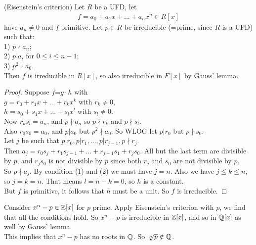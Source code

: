\documentclass[a4paper]{article}
\begin{document}
\begin{thm} (Eisenstein's criterion) 
Let $R$ be a UFD, let
\begin{equation*}
\begin{aligned}
f=a_0 + a_1 x + ... + a_n x^n \in R[x]
\end{aligned}
\end{equation*}
have $a_n \neq 0$ and $f$ primitive. Let $p\in R$ be irreducible (=prime, since $R$ is a UFD) such that:\\
1) $p \nmid a_n$;\\
2) $p | a_i$ for $0 \leq i \leq n-1$;\\
3) $p^2 \nmid a_0$.\\
Then $f$ is irreducible in $R[x]$, so also irreducible in $F[x]$ by Gauss' lemma.
\begin{proof}
Suppose $f$=$g\cdot h$ with\\
$g=r_0 + r_1 x+...+r_k x^k$ with $r_k \neq 0$,\\
$h=s_0 + s_1 x+...+s_l x^l$ with $s_l \neq 0$.\\
Now $r_k s_l = a_n$, and $p \nmid a_n$ so $p \nmid r_k$ and $p \nmid s_l$.\\
Also $r_0 s_0 = a_0$, and $p|a_0$ but $p^2 \nmid a_0$. So WLOG let $p | r_0$ but $p \nmid s_0$.\\
Let $j$ be such that $p|r_0, p|r_1,...,p|r_{j-1},p \nmid r_j$.\\
Then $a_j = r_0 s_j+r_1 s_{j-1} + ... + r_{j-1} s_1 + r_j s_0$. All but the last term are divisible by $p$, and $r_j s_0$ is not divisible by $p$ since both $r_j$ and $s_0$ are not divisible by $p$.\\
So $p \nmid a_j$. By condition (1) and (2) we must have $j=n$. Also we have $j \leq k \leq n$, so $j=k=n$. That means $l = n-k = 0$, so $h$ is a constant.\\
But $f$ is primitive, it follows that $h$ must be a unit. So $f$ is irreducible.
\end{proof}
\end{thm}

\begin{eg}
Consider $x^n - p \in \mathbb{Z}[x]$ for $p$ prime. Apply Eisenstein's criterion with $p$, we find that all the conditions hold. So $x^n - p$ is irreducible in $\mathbb{Z}[x]$, and so in $\mathbb{Q}[x]$ as well by Gauss' lemma.\\
This implies that $x^n - p$ has no roots in $\mathbb{Q}$. So $\sqrt[n]{p} \notin \mathbb{Q}$.
\end{eg}
\end{document}
